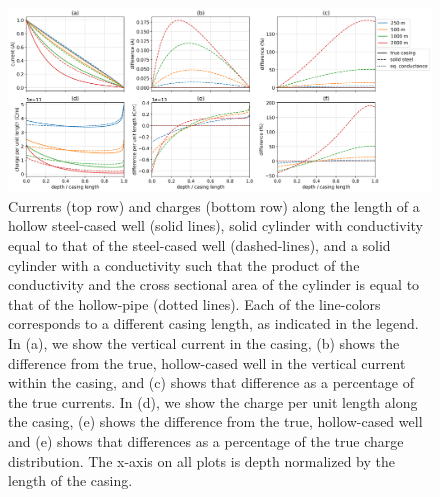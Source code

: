 \begin{figure}
    \begin{center}
    \includegraphics[width=\textwidth]{figures/dc_casing/approximating_wells_currents_charges.png}
    \end{center}
\caption{
    Currents (top row) and charges (bottom row) along the length of
    a hollow steel-cased well (solid lines), solid cylinder with
    conductivity equal to that of the steel-cased well (dashed-lines),
    and a solid cylinder with a conductivity such that the product of the
    conductivity and the cross sectional area of the cylinder is equal to that
    of the hollow-pipe (dotted lines). Each of the line-colors corresponds to a
    different casing length, as indicated in the legend.
    In (a), we show the vertical current in the casing,
    (b) shows the difference from the true, hollow-cased well
    in the vertical current within the casing, and (c) shows that difference as a percentage
    of the true currents. In (d), we show the charge per unit length along the casing, (e)
    shows the difference from the true, hollow-cased well and (e) shows that differences as
    a percentage of the true charge distribution.
    The x-axis on all plots is depth normalized by the length of the casing.
}
\label{fig:approximating_wells_currents_charges}
\end{figure}
